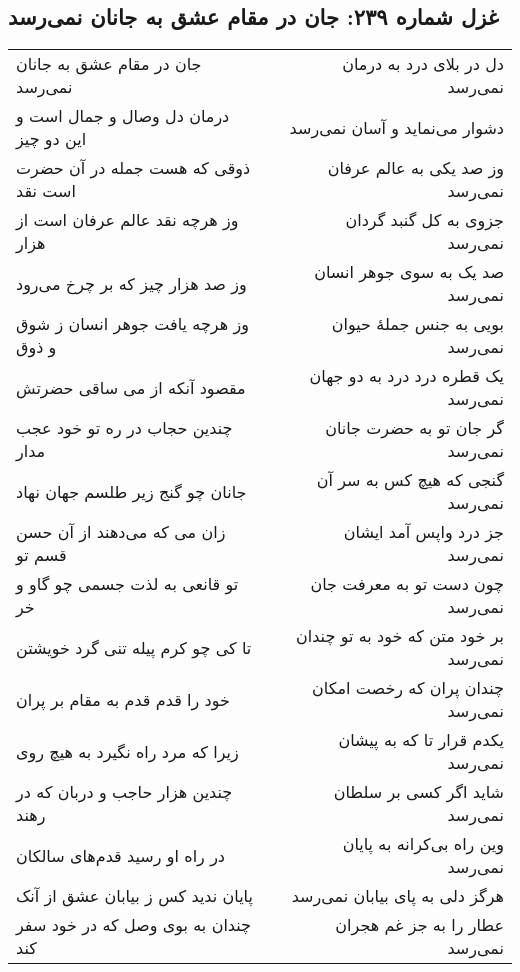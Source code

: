 \begin{center}
\section*{غزل شماره ۲۳۹: جان در مقام عشق به جانان نمی‌رسد}
\label{sec:239}
\begin{longtable}{l p{0.5cm} r}
جان در مقام عشق به جانان نمی‌رسد
&&
دل در بلای درد به درمان نمی‌رسد
\\
درمان دل وصال و جمال است و این دو چیز
&&
دشوار می‌نماید و آسان نمی‌رسد
\\
ذوقی که هست جمله در آن حضرت است نقد
&&
وز صد یکی به عالم عرفان نمی‌رسد
\\
وز هرچه نقد عالم عرفان است از هزار
&&
جزوی به کل گنبد گردان نمی‌رسد
\\
وز صد هزار چیز که بر چرخ می‌رود
&&
صد یک به سوی جوهر انسان نمی‌رسد
\\
وز هرچه یافت جوهر انسان ز شوق و ذوق
&&
بویی به جنس جملهٔ حیوان نمی‌رسد
\\
مقصود آنکه از می ساقی حضرتش
&&
یک قطره درد درد به دو جهان نمی‌رسد
\\
چندین حجاب در ره تو خود عجب مدار
&&
گر جان تو به حضرت جانان نمی‌رسد
\\
جانان چو گنج زیر طلسم جهان نهاد
&&
گنجی که هیچ کس به سر آن نمی‌رسد
\\
زان می که می‌دهند از آن حسن قسم تو
&&
جز درد واپس آمد ایشان نمی‌رسد
\\
تو قانعی به لذت جسمی چو گاو و خر
&&
چون دست تو به معرفت جان نمی‌رسد
\\
تا کی چو کرم پیله تنی گرد خویشتن
&&
بر خود متن که خود به تو چندان نمی‌رسد
\\
خود را قدم قدم به مقام بر پران
&&
چندان پران که رخصت امکان نمی‌رسد
\\
زیرا که مرد راه نگیرد به هیچ روی
&&
یکدم قرار تا که به پیشان نمی‌رسد
\\
چندین هزار حاجب و دربان که در رهند
&&
شاید اگر کسی بر سلطان نمی‌رسد
\\
در راه او رسید قدم‌های سالکان
&&
وین راه بی‌کرانه به پایان نمی‌رسد
\\
پایان ندید کس ز بیابان عشق از آنک
&&
هرگز دلی به پای بیابان نمی‌رسد
\\
چندان به بوی وصل که در خود سفر کند
&&
عطار را به جز غم هجران نمی‌رسد
\\
\end{longtable}
\end{center}
